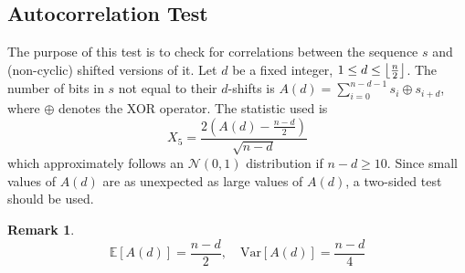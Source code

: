 \documentclass[12pt,openany]{book}
\DeclarePairedDelimiter{\floor}{\lfloor}{\rfloor}
\theoremstyle{definition}
\newtheorem{remark}{Remark}[chapter]
\newcommand{\E}{\mathbb{E}}
\newcommand{\Var}{\text{Var}}
\begin{document}
\newpage
\subsection{Autocorrelation Test}
\begin{tcolorbox}[colback=white,colframe=lemcolor,arc=5pt,title={\color{white}\bf Autocorrelation Test}]
	The purpose of this test is to check for correlations between the sequence \( s \) and (non-cyclic) shifted versions of it. Let \( d \) be a fixed integer, \( 1 \leq d \leq \floor*{\frac{n}{2}} \). The number of bits in \( s \) not equal to their \( d \)-shifts is \( A(d) = \sum_{i=0}^{n-d-1} s_i \oplus s_{i+d} \), where \( \oplus \) denotes the XOR operator. The statistic used is
	\[ X_5 = \frac{2(A(d) - \frac{n-d}{2})}{\sqrt{n-d}} \]
	which approximately follows an \( \mathcal{N}(0, 1) \) distribution if \( n - d \geq 10 \). Since small values of \( A(d) \) are as unexpected as large values of \( A(d) \), a two-sided test should be used.
\end{tcolorbox}
\begin{remark}
	\[
	\E[A(d)]=\frac{n-d}{2},\quad\Var[A(d)]=\frac{n-d}{4}
	\]
\end{remark}
\vspace{24pt}
\end{document}
